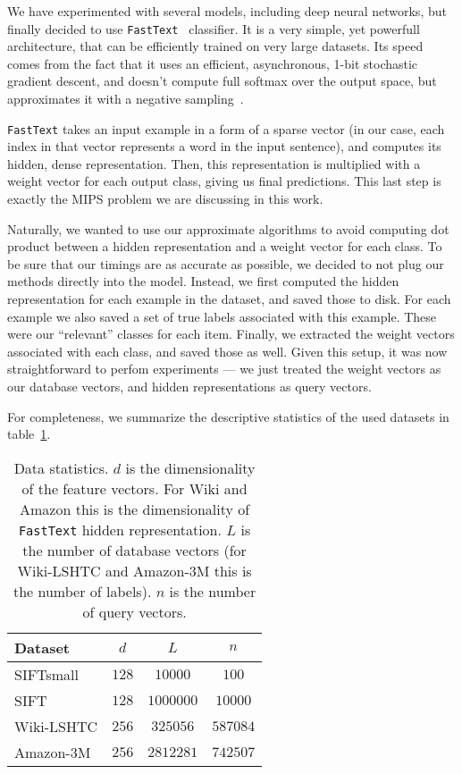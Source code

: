         We have experimented with several models, including deep neural networks, but finally decided to
        use \texttt{FastText}~\cite{fasttext} classifier. It is a very simple, yet powerfull architecture, that
        can be efficiently trained on very large datasets. Its speed comes from the fact that it uses an efficient,
        asynchronous, 1-bit stochastic gradient descent, and doesn't compute full softmax over the output space,
        but approximates it with a negative sampling~\cite{w2v}.

        \texttt{FastText} takes an input example in a form of a sparse vector (in our case, each index in that vector
        represents a word in the input sentence), and computes its hidden, dense representation. Then, this
        representation is multiplied with a weight vector for each output class, giving us final predictions.
        This last step is exactly the MIPS problem we are discussing in this work.

        Naturally, we wanted to use our approximate algorithms to avoid computing dot product between a hidden
        representation and a weight vector for each class. To be sure that our timings are as accurate as possible,
        we decided to not plug our methods directly into the model. Instead, we first computed the hidden representation
        for each example in the dataset, and saved those to disk. For each example we also saved a set of
        true labels associated with this example. These were our ``relevant'' classes for each item.
        Finally, we extracted the weight vectors associated with each class, and saved those as well. Given this setup,
        it was now straightforward to perfom experiments --- we just treated the weight vectors as our database vectors,
        and hidden representations as query vectors.

        For completeness, we summarize the descriptive statistics of the used datasets in table~\ref{tab:dsz}.

        \begin{table}
          \caption{Data statistics. $d$ is the dimensionality of the feature vectors. For Wiki and Amazon this
          is the dimensionality of \texttt{FastText} hidden representation. $L$ is the number
          of database vectors (for Wiki-LSHTC and Amazon-3M this is the number of labels). $n$ is the number of query vectors.}
          \label{tab:dsz}
          \centering
          {
          \begin{tabular}{l|c|c|c|}
            Dataset & $d$ &$L$& $n$ \\
            \hline
            SIFTsmall   & $128$ & $10000$   & $100$    \\
            SIFT        & $128$ & $1000000$ & $10000$  \\
            Wiki-LSHTC  & $256$ & $325056$  & $587084$ \\
            Amazon-3M   & $256$ & $2812281$ & $742507$ \\
          \end{tabular}
          }
        \end{table}


